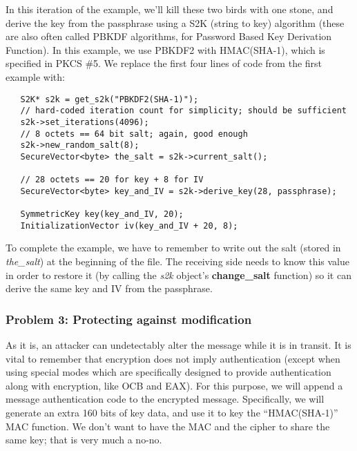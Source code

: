 \documentclass{article}
\newcommand{\function}[1]{\textbf{#1}}
\newcommand{\variable}[1]{\textsl{#1}}
\begin{document}
In this iteration of the example, we'll kill these two birds with one stone,
and derive the key from the passphrase using a S2K (string to key) algorithm
(these are also often called PBKDF algorithms, for Password Based Key
Derivation Function). In this example, we use PBKDF2 with HMAC(SHA-1), which is
specified in PKCS \#5. We replace the first four lines of code from the first
example with:

\begin{verbatim}
   S2K* s2k = get_s2k("PBKDF2(SHA-1)");
   // hard-coded iteration count for simplicity; should be sufficient
   s2k->set_iterations(4096);
   // 8 octets == 64 bit salt; again, good enough
   s2k->new_random_salt(8);
   SecureVector<byte> the_salt = s2k->current_salt();

   // 28 octets == 20 for key + 8 for IV
   SecureVector<byte> key_and_IV = s2k->derive_key(28, passphrase);

   SymmetricKey key(key_and_IV, 20);
   InitializationVector iv(key_and_IV + 20, 8);
\end{verbatim}

To complete the example, we have to remember to write out the salt (stored in
\variable{the\_salt}) at the beginning of the file. The receiving side needs to
know this value in order to restore it (by calling the \variable{s2k} object's
\function{change\_salt} function) so it can derive the same key and IV from the
passphrase.

\subsubsection{Problem 3: Protecting against modification}

As it is, an attacker can undetectably alter the message while it is in
transit. It is vital to remember that encryption does not imply authentication
(except when using special modes which are specifically designed to provide
authentication along with encryption, like OCB and EAX). For this purpose, we
will append a message authentication code to the encrypted
message. Specifically, we will generate an extra 160 bits of key data, and use
it to key the ``HMAC(SHA-1)'' MAC function. We don't want to have the MAC and
the cipher to share the same key; that is very much a no-no.
\end{document}
